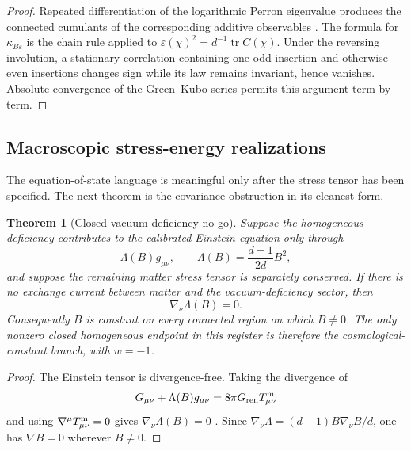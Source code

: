 \documentclass[11pt]{article}
\newtheorem{theorem}{Theorem}[section]
\theoremstyle{definition}
\theoremstyle{remark}
\newcommand{\eps}{\varepsilon}
\newcommand{\tr}{\operatorname{tr}}
\newcommand{\Gren}{G_{\mathrm{ren}}}
\begin{document}
\begin{proof}
Repeated differentiation of the logarithmic Perron eigenvalue produces the
connected cumulants of the corresponding additive observables
\cite{Nagaev,KipnisVaradhan}.  The formula for \(\kappa_{B\eps}\) is the chain
rule applied to \(\eps(\chi)^2=d^{-1}\tr C(\chi)\).  Under the reversing
involution, a stationary correlation containing one odd insertion and otherwise
even insertions changes sign while its law remains invariant, hence vanishes.
Absolute convergence of the Green--Kubo series permits this argument term by
term.
\end{proof}

\subsection{Macroscopic stress-energy realizations}
\label{subsec:dark-energy-registers}

The equation-of-state language is meaningful only after the stress tensor has
been specified.  The next theorem is the covariance obstruction in its cleanest
form.

\begin{theorem}[Closed vacuum-deficiency no-go]
\label{thm:closed-source-free-deficiency-nogo}
Suppose the homogeneous deficiency contributes to the calibrated Einstein
equation only through
\[
  \Lambda(B)g_{\mu\nu},
  \qquad
  \Lambda(B)=\frac{d-1}{2d}B^2,
\]
and suppose the remaining matter stress tensor is separately conserved.  If
there is no exchange current between matter and the vacuum-deficiency sector,
then
\[
  \nabla_\nu\Lambda(B)=0.
\]
Consequently \(B\) is constant on every connected region on which \(B\ne0\).
The only nonzero closed homogeneous endpoint in this register is therefore the
cosmological-constant branch, with \(w=-1\).
\end{theorem}

\begin{proof}
The Einstein tensor is divergence-free.  Taking the divergence of
\[
  G_{\mu\nu}+\Lambda(B)g_{\mu\nu}
   =8\pi\Gren T^{\rm m}_{\mu\nu}
\]
and using \(\nabla^\mu T^{\rm m}_{\mu\nu}=0\) gives
\(\nabla_\nu\Lambda(B)=0\) \cite{WaldBook}.  Since
\(\nabla_\nu\Lambda=(d-1)B\nabla_\nu B/d\), one has
\(\nabla B=0\) wherever \(B\ne0\).
\end{proof}
\end{document}
